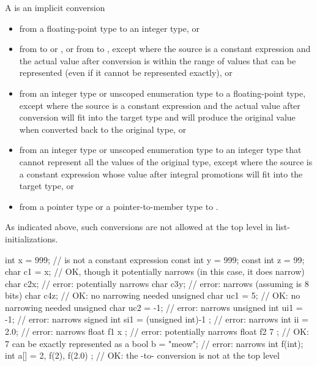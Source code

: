 \pnum
A  is an implicit conversion
\begin{itemize}
\item from a floating-point type to an integer type, or

\item from  to  or , or from
 to , except where the source is a constant expression and
the actual value after conversion
is within the range of values that can be represented (even if it cannot be represented exactly),
or

\item from an integer type or unscoped enumeration type to a floating-point type, except
where the source is a constant expression and the actual value after conversion will fit
into the target type and will produce the original value when converted back to the
original type, or

\item from an integer type or unscoped enumeration type to an integer type that cannot
represent all the values of the original type, except where the source is a constant
expression whose value after integral promotions will fit into the target type, or

\item from a pointer type or a pointer-to-member type to .
\end{itemize}

\begin{note}
As indicated above, such conversions are not allowed at the top level in
list-initializations.
\end{note}
\begin{example}
\begin{codeblock}
int x = 999;                    //  is not a constant expression
const int y = 999;
const int z = 99;
char c1 = x;                    // OK, though it potentially narrows (in this case, it does narrow)
char c2{x};                     // error: potentially narrows
char c3{y};                     // error: narrows (assuming  is 8 bits)
char c4{z};                     // OK: no narrowing needed
unsigned char uc1 = {5};        // OK: no narrowing needed
unsigned char uc2 = {-1};       // error: narrows
unsigned int ui1 = {-1};        // error: narrows
signed int si1 =
  { (unsigned int)-1 };         // error: narrows
int ii = {2.0};                 // error: narrows
float f1 { x };                 // error: potentially narrows
float f2 { 7 };                 // OK: 7 can be exactly represented as a 
bool b = {"meow"};              // error: narrows
int f(int);
int a[] = { 2, f(2), f(2.0) };  // OK: the -to- conversion is not at the top level
\end{codeblock}
\end{example}
%
%

